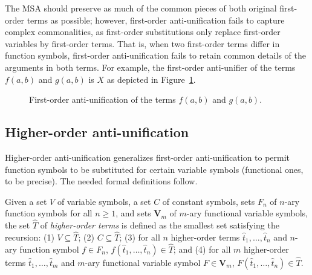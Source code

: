 The MSA should preserve as much of the common pieces of both original first-order terms as possible; however, first-order anti-unification fails to capture complex commonalities, as first-order substitutions only replace first-order variables by first-order terms. That is, when two first-order terms differ in function symbols, first-order anti-unification fails to retain common details of the arguments in both terms. For example, the first-order anti-unifier of the terms $f(a,b)$ and $g(a,b)$ is $X$ as depicted in Figure~\ref{fig:first-anti-uni}.

\begin{figure}[t]
\centering{}
\caption{First-order anti-unification of the terms $f(a,b)$ and $g(a,b)$.\label{fig:first-anti-uni}}
\end{figure}

\subsection{Higher-order anti-unification}
 
Higher-order anti-unification generalizes first-order anti-unification to permit function symbols to be substituted for certain variable symbols (functional ones, to be precise).  The needed formal definitions follow.

\begin{defn}\label{def:hterm}
Given a set $V$ of variable symbols, a set $C$ of constant symbols, sets $F_n$ of $n$-ary function symbols for all $n\ge1$, and sets $\mathbf{V}_m$ of $m$-ary functional variable symbols, the set $\hat{T}$ of \emph{higher-order terms} is defined as the smallest set satisfying the recursion: (1) $V\subseteq \hat{T}$; (2) $C\subseteq \hat{T}$; (3) for all $n$ higher-order terms $\hat{t}_1, \ldots, \hat{t}_n$ and $n$-ary function symbol $f\in F_n$,  $f(\hat{t}_1, \ldots, \hat{t}_n) \in \hat{T}$; and (4) for all $m$ higher-order terms $\hat{t}_1, \ldots, \hat{t}_m$ and $m$-ary functional variable symbol $F\in \mathbf{V}_m$,  $F(\hat{t}_1, \ldots, \hat{t}_n) \in \hat{T}$.
\end{defn}
 
